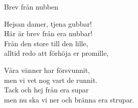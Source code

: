 \begin{song}{Brev från nubben}
	
	

    Hejsan damer, tjena gubbar!\\
	Här är brev från era nubbar!\\
	Från den store till den lille,\\
	alltid redo att förhöja er promille,

	Våra vänner har försvunnit,\\
	men vi vet nog vart de runnit.\\
	Tack och hej från era supar\\
	men nu ska vi ner och bränna era strupar.
	
\end{song}
